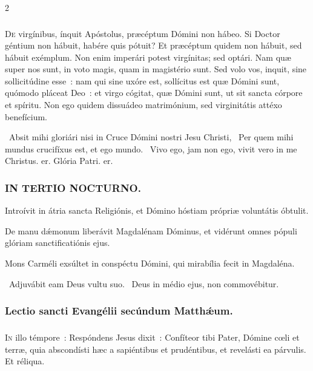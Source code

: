 \documentclass[9pt,twoside]{extarticle}
\begin{document}
\begin{multicols}{2}
{\subsubsection*{\center {}}
\lettrine{D}e virgínibus, ínquit Apóstolus, præcéptum Dómini non hábeo. Si Doctor géntium non hábuit, habére quis pótuit? Et præcéptum quidem non hábuit, sed hábuit exémplum. Non enim imperári potest virgínitas; sed optári. Nam quæ super nos sunt, in voto magis, quam in magistério sunt. Sed volo vos, inquit, sine sollicitúdine esse~: nam qui sine uxóre est, sollícitus est quæ Dómini sunt, quómodo pláceat Deo~: et virgo cógitat, quæ Dómini sunt, ut sit sancta córpore et spíritu. Non ego quidem dissuádeo matrimónium, sed virginitátis attéxo benefícium.

\begin{tightlist}{}
\item {}~Absit mihi gloriári nisi in Cruce Dómini nostri Jesu Christi, \textred{*}~Per quem mihi mundus crucifíxus est, et ego mundo. ~Vivo ego, jam non ego, vivit vero in me Christus. er. Glória Patri. er.
\end{tightlist}

\subsubsection*{\center \textsc{IN TERTIO NOCTURNO.}}
\begin{tightlist}{}
\item {} Introívit in átria sancta Religiónis, et Dómino hóstiam própriæ voluntátis óbtulit.
\item {} De manu dǽmonum liberávit Magdalénam Dóminus, et vidérunt omnes pópuli glóriam sanctificatiónis ejus.
\item {} Mons Carméli exsúltet in conspéctu Dómini, qui mirabília fecit in Magdaléna.
\item {}~Adjuvábit eam Deus vultu suo. ~Deus in médio ejus, non commovébitur.
\end{tightlist}

\subsubsection*{\center Lectio sancti Evangélii secúndum Matthǽum.}
\subsubsection*{\center {}}
\lettrine{I}n illo témpore~: Respóndens Jesus dixit~: Confíteor tibi Pater, Dómine cœli et terræ, quia abscondísti hæc a sapiéntibus et prudéntibus, et revelásti ea párvulis. Et réliqua.

}
\end{multicols}
\end{document}

